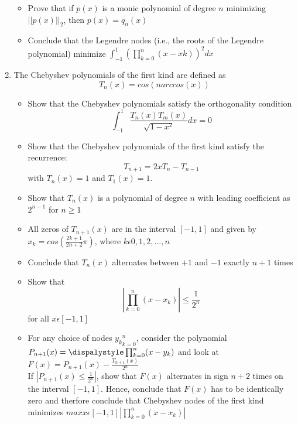 \documentclass{article}
\begin{document}
\begin{enumerate}
\begin{itemize}
\item Prove that if $p(x)$ is a monic polynomial of degree $n$ minimizing $||p(x)||_{2}$, then $p(x) = q_{n}(x)$
\item Conclude that the Legendre nodes (i.e., the roots of the Legendre polynomial) minimize $\displaystyle \int_{-1}^{1} \left( \prod_{k=0}^{n} (x-x{k}) \right)^{2} dx$
\end{itemize}

\item The Chebyshev polynomials of the first kind are defined as
    $$T_{n}(x) = cos(n arccos(x))$$

\begin{itemize}
\item Show that the Chebyshev polynomials satisfy the orthogonality condition
    $$\displaystyle \int_{-1}^{1} \frac{T_{n}(x) T_{m}(x)}{\sqrt{1 - x^{2}}} dx = 0$$

\item Show that the Chebyshev polynomials of the first kind satisfy the recurrence:
    $$T_{n+1} = 2xT_{n} - T_{n-1}$$
with $T_{n}(x) = 1$ and $T_{1}(x) = 1$.

\item Show that $T_{n}(x)$ is a polynomial of degree $n$ with leading coefficient as $2^{n-1}$ for $n \geq 1$

\item All zeros of $T_{n+1}(x)$ are in the interval $[-1, 1]$ and given by $x_{k} = cos \left( \displaystyle \frac{2k+1}{2n+2} \pi \right)$, where $k \epsilon {0, 1, 2, ..., n}$

\item Conclude that $T_{n}(x)$ alternates between $+1$ and $-1$ exactly $n+1$ times
\item Show that
    $$\displaystyle \left| \prod_{k=0}^{n} (x - x_{k}) \right| \leq \frac{1}{2^{n}}$$
for all $x \epsilon [-1, 1]$


\item For any choice of nodes ${y_{k}}_{k=0}^{n}$, consider the polynomial $P_{n+1}(x) = \dispalystyle \prod_{k=0}^{n} (x - y_{k})$ and look at $F(x) = P_{n+1}(x) - \frac{T_{n+1}(x)}{2^{n}}$ \\

    If $|P_{n+1}(x) \leq \displaystyle \frac{1}{2^{n}}|$, show that $F(x)$ alternates in sign $n+2$ times on the interval $[-1, 1]$. Hence, conclude that $F(x)$ has to be identically zero and therfore conclude that Chebyshev nodes of the first kind minimizes $max x \epsilon [-1, 1] \left| \displaystyle \prod_{k=0}^{n} (x - x_{k}) \right|$
\end{itemize}


\end{enumerate}
\end{document}
